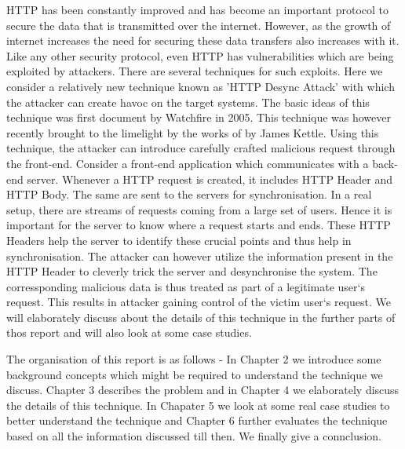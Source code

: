 HTTP has been constantly improved and has become an important protocol to secure the data that is transmitted over the internet. However, as the growth of internet increases the need for securing these data transfers also increases with it. Like any other security protocol, even HTTP has vulnerabilities which are being exploited by attackers. There are several techniques for such exploits. Here we consider a relatively new technique known as 'HTTP Desync Attack' with which the attacker can create havoc on the target systems. The basic ideas of this technique was first document by Watchfire in 2005\cite{b5}. This technique was however recently brought to the limelight by the works of by James Kettle\cite{b6}.  Using this technique, the attacker can introduce carefully crafted malicious request through the front-end. Consider a front-end application which communicates with a back-end server.  Whenever a HTTP request is created, it includes HTTP Header and HTTP Body. The same are sent to the servers for synchronisation. In a real setup, there are streams of requests coming from a large set of users. Hence it is important for the server to know where a request starts and ends. These HTTP Headers help the server to identify these crucial points and thus help in synchronisation. The attacker can however utilize the information present in the HTTP Header to cleverly trick the server and desynchronise the system. The corressponding malicious data is thus treated as part of a legitimate user`s request. This results in attacker gaining control of the victim user`s request. We will elaborately discuss about the details of this technique in the further parts of thos report and will also look at some case studies. 

The organisation of this report is as follows - In Chapter 2 we introduce some background concepts which might be required to understand the technique we discuss. Chapter 3 describes the problem and in Chapter 4 we elaborately discuss the details of this technique. In Chapater 5 we look at some real case studies to better understand the technique and Chapter 6 further evaluates the technique based on all the information discussed till then. We finally give a connclusion. 


